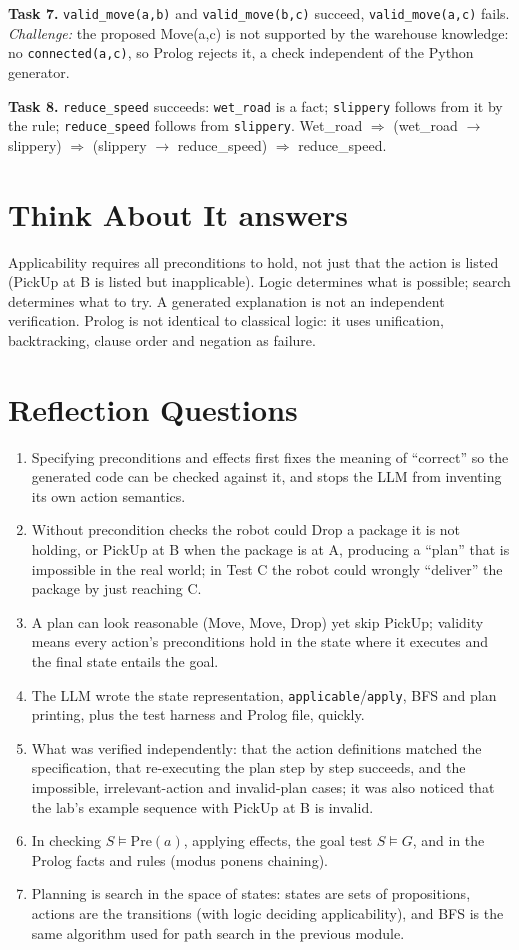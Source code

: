 \documentclass[10pt,a4paper]{article}
\begin{document}
\textbf{Task 7.} \texttt{valid\_move(a,b)} and \texttt{valid\_move(b,c)} succeed, \texttt{valid\_move(a,c)} fails. \emph{Challenge:} the proposed Move(a,c) is not supported by the warehouse knowledge: no \texttt{connected(a,c)}, so Prolog rejects it, a check independent of the Python generator.

\textbf{Task 8.} \texttt{reduce\_speed} succeeds: \texttt{wet\_road} is a fact; \texttt{slippery} follows from it by the rule; \texttt{reduce\_speed} follows from \texttt{slippery}. Wet\_road $\Rightarrow$ (wet\_road $\rightarrow$ slippery) $\Rightarrow$ (slippery $\rightarrow$ reduce\_speed) $\Rightarrow$ reduce\_speed.

\section*{Think About It answers}
Applicability requires all preconditions to hold, not just that the action is listed (PickUp at B is listed but inapplicable). Logic determines what is possible; search determines what to try. A generated explanation is not an independent verification. Prolog is not identical to classical logic: it uses unification, backtracking, clause order and negation as failure.

\section*{Reflection Questions}
\begin{enumerate}[leftmargin=*]
\item Specifying preconditions and effects first fixes the meaning of ``correct'' so the generated code can be checked against it, and stops the LLM from inventing its own action semantics.
\item Without precondition checks the robot could Drop a package it is not holding, or PickUp at B when the package is at A, producing a ``plan'' that is impossible in the real world; in Test C the robot could wrongly ``deliver'' the package by just reaching C.
\item A plan can look reasonable (Move, Move, Drop) yet skip PickUp; validity means every action's preconditions hold in the state where it executes and the final state entails the goal.
\item The LLM wrote the state representation, \texttt{applicable}/\texttt{apply}, BFS and plan printing, plus the test harness and Prolog file, quickly.
\item What was verified independently: that the action definitions matched the specification, that re-executing the plan step by step succeeds, and the impossible, irrelevant-action and invalid-plan cases; it was also noticed that the lab's example sequence with PickUp at B is invalid.
\item In checking $S\models \mathrm{Pre}(a)$, applying effects, the goal test $S\models G$, and in the Prolog facts and rules (modus ponens chaining).
\item Planning is search in the space of states: states are sets of propositions, actions are the transitions (with logic deciding applicability), and BFS is the same algorithm used for path search in the previous module.
\end{enumerate}
\end{document}
